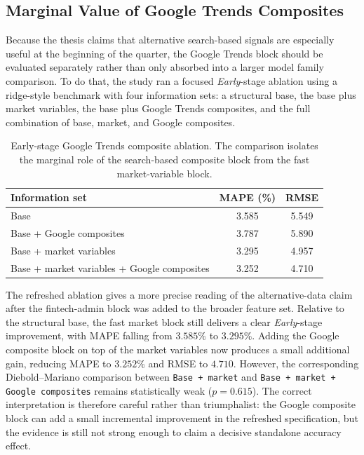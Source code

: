 \documentclass[12pt,a4paper]{report}
\begin{document}
\subsection{Marginal Value of Google Trends Composites}

Because the thesis claims that alternative search-based signals are especially useful at the beginning of the quarter, the Google Trends block should be evaluated separately rather than only absorbed into a larger model family comparison. To do that, the study ran a focused \textit{Early}-stage ablation using a ridge-style benchmark with four information sets: a structural base, the base plus market variables, the base plus Google Trends composites, and the full combination of base, market, and Google composites.

\begin{table}[H]
    \centering
    \small
    \caption{Early-stage Google Trends composite ablation. The comparison isolates the marginal role of the search-based composite block from the fast market-variable block.}
    \label{tab:google_ablation}
    \begin{tabular}{lcc}
        \hline
        Information set & MAPE (\%) & RMSE \\
        \hline
        Base & 3.585 & 5.549 \\
        Base + Google composites & 3.787 & 5.890 \\
        Base + market variables & 3.295 & 4.957 \\
        Base + market variables + Google composites & 3.252 & 4.710 \\
        \hline
    \end{tabular}
\end{table}

The refreshed ablation gives a more precise reading of the alternative-data claim after the fintech-admin block was added to the broader feature set. Relative to the structural base, the fast market block still delivers a clear \textit{Early}-stage improvement, with MAPE falling from $3.585\%$ to $3.295\%$. Adding the Google composite block on top of the market variables now produces a small additional gain, reducing MAPE to $3.252\%$ and RMSE to $4.710$. However, the corresponding Diebold--Mariano comparison between \texttt{Base + market} and \texttt{Base + market + Google composites} remains statistically weak ($p = 0.615$). The correct interpretation is therefore careful rather than triumphalist: the Google composite block can add a small incremental improvement in the refreshed specification, but the evidence is still not strong enough to claim a decisive standalone accuracy effect.
\end{document}
